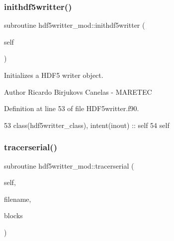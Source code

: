 \subsubsection{\texorpdfstring{inithdf5writter()}{inithdf5writter()}}
{\footnotesize\ttfamily subroutine hdf5writter\+\_\+mod\+::inithdf5writter (\begin{DoxyParamCaption}\item[{class(\mbox{\hyperlink{structhdf5writter__mod_1_1hdf5writter__class}{hdf5writter\+\_\+class}}), intent(inout)}]{self }\end{DoxyParamCaption})\hspace{0.3cm}{\ttfamily [private]}}



Initializes a H\+D\+F5 writer object. 

\begin{DoxyAuthor}{Author}
Ricardo Birjukovs Canelas -\/ M\+A\+R\+E\+T\+EC 
\end{DoxyAuthor}


Definition at line 53 of file H\+D\+F5writter.\+f90.


\begin{DoxyCode}
53     \textcolor{keywordtype}{class}(hdf5writter\_class), \textcolor{keywordtype}{intent(inout)} :: self
54     self%
\end{DoxyCode}
\mbox{\label{namespacehdf5writter__mod_a5f79038dbb067a692a12d171e51b5703}} 
\subsubsection{\texorpdfstring{tracerserial()}{tracerserial()}}
{\footnotesize\ttfamily subroutine hdf5writter\+\_\+mod\+::tracerserial (\begin{DoxyParamCaption}\item[{class(\mbox{\hyperlink{structhdf5writter__mod_1_1hdf5writter__class}{hdf5writter\+\_\+class}}), intent(inout)}]{self,  }\item[{type(string), intent(in)}]{filename,  }\item[{class(\mbox{\hyperlink{structblocks__mod_1_1block__class}{block\+\_\+class}}), dimension(\+:), intent(in)}]{blocks }\end{DoxyParamCaption})\hspace{0.3cm}{\ttfamily [private]}}



